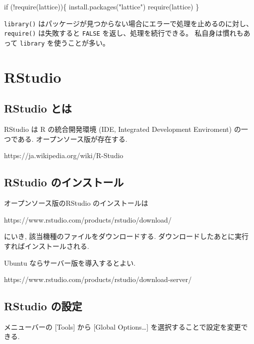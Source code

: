 \documentclass[
  letterpaper,
  xelatex,
  ja=standard, xelatex]{bxjsbook}
\newenvironment{Shaded}{\begin{snugshade}}{\end{snugshade}}
\newcommand{\ControlFlowTok}[1]{\textcolor[rgb]{0.00,0.23,0.31}{#1}}
\newcommand{\FunctionTok}[1]{\textcolor[rgb]{0.28,0.35,0.67}{#1}}
\newcommand{\NormalTok}[1]{\textcolor[rgb]{0.00,0.23,0.31}{#1}}
\newcommand{\SpecialCharTok}[1]{\textcolor[rgb]{0.37,0.37,0.37}{#1}}
\newcommand{\StringTok}[1]{\textcolor[rgb]{0.13,0.47,0.30}{#1}}
\begin{document}
\begin{Shaded}
\begin{Highlighting}[]
\ControlFlowTok{if}\NormalTok{ (}\SpecialCharTok{!}\FunctionTok{require}\NormalTok{(lattice))\{}
  \FunctionTok{install.packages}\NormalTok{(}\StringTok{"lattice"}\NormalTok{)}
  \FunctionTok{require}\NormalTok{(lattice)}
\NormalTok{\} }
\end{Highlighting}
\end{Shaded}

\texttt{library()}
はパッケージが見つからない場合にエラーで処理を止めるのに対し、\texttt{require()}
は失敗すると \texttt{FALSE} を返し、処理を続行できる。
私自身は慣れもあって \texttt{library} を使うことが多い。


\chapter{RStudio}\label{rstudio}

\section{RStudio とは}\label{rstudio-ux3068ux306f}

RStudio は R の統合開発環境 (IDE, Integrated Development Enviroment)
の一つである. オープンソース版が存在する.

https://ja.wikipedia.org/wiki/R-Studio

\section{RStudio
のインストール}\label{rstudio-ux306eux30a4ux30f3ux30b9ux30c8ux30fcux30eb}

オープンソース版のRStudio のインストールは

https://www.rstudio.com/products/rstudio/download/

にいき, 該当機種のファイルをダウンロードする.
ダウンロードしたあとに実行すればインストールされる.

Ubuntu ならサーバー版を導入するとよい.

https://www.rstudio.com/products/rstudio/download-server/

\section{RStudio の設定}\label{rstudio-ux306eux8a2dux5b9a}

メニューバーの {[}Tools{]} から {[}Global Options\ldots{]}
を選択することで設定を変更できる.
\end{document}
